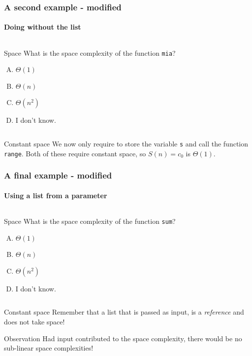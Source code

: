 \begin{frame}
	\frametitle{A second example - modified}
	\framesubtitle{Doing without the list}
	
	\begin{columns}
		
		\pause
		\begin{block}{Space}
			What is the space complexity of the function \texttt{mia}?
			\begin{enumerate}[A.]
				\item $\Theta(1)$
				\item $\Theta(n)$ 
				\item $\Theta(n^2)$
				\item I don't know.
			\end{enumerate}
		\end{block}
	\end{columns}
	\pause
	\begin{block}{Constant space}
		We now only require to store the variable \texttt{s} and call the function \texttt{range}. Both of these require
		constant space, so $S(n) = c_0$ is $\Theta(1)$.
	\end{block}
\end{frame}

\begin{frame}
	\frametitle{A final example - modified}
	\framesubtitle{Using a list from a parameter}
	
	\begin{columns}
		\column{0.455\textwidth}
		
		\column{0.455\textwidth}
		\pause
		\begin{block}{Space}
			What is the space complexity of the function \texttt{sum}?
			\begin{enumerate}[A.]
				\item $\Theta(1)$
				\item $\Theta(n)$ 
				\item $\Theta(n^2)$
				\item I don't know.
			\end{enumerate}
		\end{block}
	\end{columns}
	\pause
	\begin{block}{Constant space}
		Remember that a list that is passed as input, is a \textit{reference} and does not take space!
	\end{block}
	\pause
		\begin{block}{Observation}
			Had input contributed to the space complexity, there would be no sub-linear space complexities!	
		\end{block}	
\end{frame}

